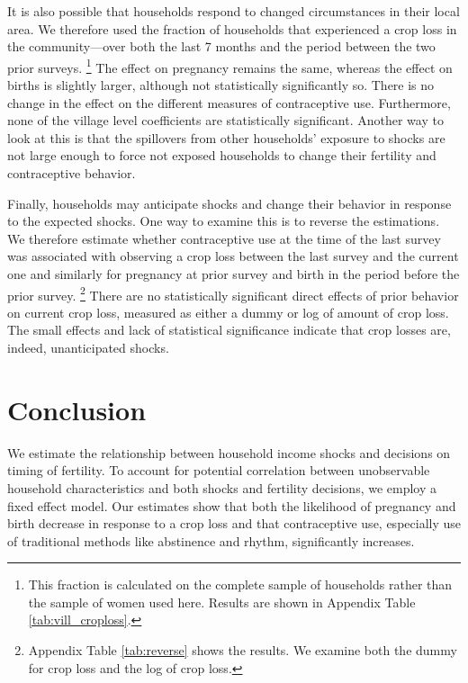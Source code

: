 \documentclass[letterpaper,12pt]{article}
\begin{document}

It is also possible that households respond to changed circumstances
in their local area.
We therefore used the fraction of households that experienced a crop
loss in the community---over both the last 7 months and the period 
between the two prior surveys.%
\footnote{
This fraction is calculated on the complete sample of households
rather than the sample of women used here.
Results are shown in Appendix Table \ref{tab:vill_croploss}.
}
The effect on pregnancy remains the same, whereas the effect on
births is slightly larger, although not statistically significantly so.
There is no change in the effect on the different measures of
contraceptive use.
Furthermore, none of the village level coefficients are statistically 
significant.
Another way to look at this is that the spillovers from other
households' exposure to shocks are not large enough to force 
not exposed households to change their fertility and contraceptive
behavior.


Finally, households may anticipate shocks and
change their behavior in response to the expected shocks.
One way to examine this is to reverse the estimations.
We therefore estimate whether contraceptive use at the time of the last 
survey was associated with observing a crop loss between the last survey
and the current one and similarly for pregnancy at prior survey and 
birth in the period before the prior survey.%
\footnote{
Appendix Table \ref{tab:reverse} shows the results.
We examine both the dummy for crop loss and the log of crop loss.
}
There are no statistically significant direct effects of 
prior behavior on current crop loss, measured as either a
dummy or log of amount of crop loss.
The small effects and lack of statistical significance 
indicate that crop losses are, indeed, unanticipated 
shocks.


\section{Conclusion}

We estimate the relationship between household income shocks and decisions
on timing of fertility. 
To account for potential correlation between unobservable household
characteristics and both shocks and fertility decisions, we employ a fixed effect model.
Our estimates show that both the likelihood of pregnancy and birth decrease in
response to a crop loss and that contraceptive use, especially use of traditional 
methods like abstinence and rhythm, significantly increases. 
\end{document}
